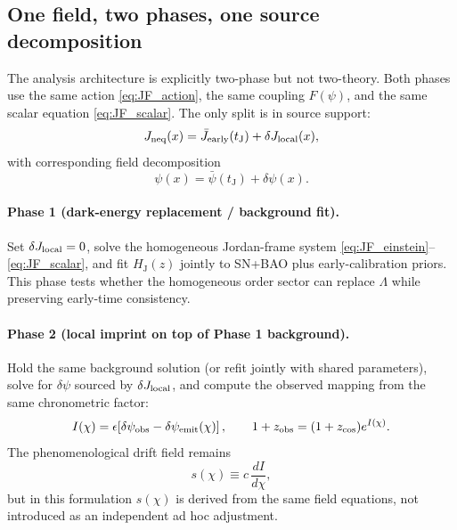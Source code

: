 \documentclass[10pt]{article}
\newcommand{\zobs}{z_{\mathrm{obs}}}
\newcommand{\zcos}{z_{\mathrm{cos}}}
\newcommand{\HJ}{H_{\mathrm{J}}}
\newcommand{\tJ}{t_{\mathrm{J}}}
\begin{document}
\subsection{One field, two phases, one source decomposition}
\label{sec:phase12_unified}

The analysis architecture is explicitly two-phase but not two-theory.
Both phases use the same action \eqref{eq:JF_action}, the same coupling \(F(\psi)\), and the same scalar equation \eqref{eq:JF_scalar}.
The only split is in source support:
\begin{equation}
J_{\rm neq}(x)=\bar J_{\rm early}(\tJ)+\delta J_{\rm local}(x),
\label{eq:Jneq_split_main}
\end{equation}
with corresponding field decomposition
\begin{equation}
\psi(x)=\bar\psi(\tJ)+\delta\psi(x).
\label{eq:psi_split_main}
\end{equation}

\paragraph{Phase 1 (dark-energy replacement / background fit).}
Set \(\delta J_{\rm local}=0\), solve the homogeneous Jordan-frame system
\eqref{eq:JF_einstein}--\eqref{eq:JF_scalar}, and fit \(\HJ(z)\) jointly to SN+BAO plus early-calibration priors.
This phase tests whether the homogeneous order sector can replace \(\Lambda\) while preserving early-time consistency.

\paragraph{Phase 2 (local imprint on top of Phase 1 background).}
Hold the same background solution (or refit jointly with shared parameters), solve for \(\delta\psi\) sourced by \(\delta J_{\rm local}\),
and compute the observed mapping from the same chronometric factor:
\begin{equation}
I(\chi)=\epsilon\!\left[\delta\psi_{\rm obs}-\delta\psi_{\rm emit}(\chi)\right],
\qquad
1+\zobs=(1+\zcos)e^{I(\chi)}.
\label{eq:I_from_delta_psi_main}
\end{equation}
The phenomenological drift field remains
\begin{equation}
s(\chi)\equiv c\,\frac{dI}{d\chi},
\label{eq:s_from_unified_main}
\end{equation}
but in this formulation \(s(\chi)\) is derived from the same field equations, not introduced as an independent ad hoc adjustment.
\end{document}
